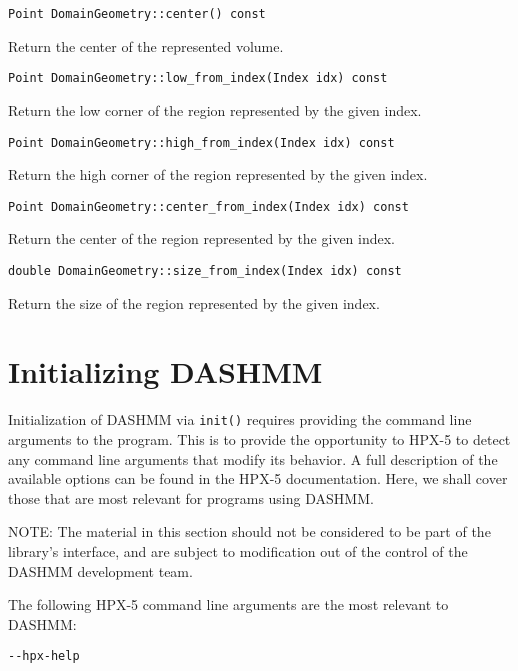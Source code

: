 \begin{lstlisting}
Point DomainGeometry::center() const
\end{lstlisting}


Return the center of the represented volume.

\begin{lstlisting}
Point DomainGeometry::low_from_index(Index idx) const
\end{lstlisting}


Return the low corner of the region represented by the given index.

\begin{lstlisting}
Point DomainGeometry::high_from_index(Index idx) const
\end{lstlisting}


Return the high corner of the region represented by the given index.

\begin{lstlisting}
Point DomainGeometry::center_from_index(Index idx) const
\end{lstlisting}


Return the center of the region represented by the given index.

\begin{lstlisting}
double DomainGeometry::size_from_index(Index idx) const
\end{lstlisting}


Return the size of the region represented by the given index.



\section{Initializing DASHMM}

Initialization of DASHMM via \texttt{init()} requires providing the command
line arguments to the program. This is to provide the opportunity to HPX-5 to
detect any command line arguments that modify its behavior. A full description
of the available options can be found in the HPX-5 documentation. Here, we
shall cover those that are most relevant for programs using DASHMM.

NOTE: The material in this section should not be considered to be part of the
library's interface, and are subject to modification out of the control of
the DASHMM development team.

The following HPX-5 command line arguments are the most relevant to DASHMM:

\begin{lstlisting}
--hpx-help
\end{lstlisting}

